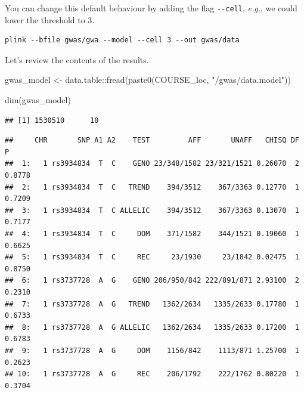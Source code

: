 \documentclass[
]{book}
\newenvironment{Shaded}{\begin{snugshade}}{\end{snugshade}}
\newcommand{\DecValTok}[1]{\textcolor[rgb]{0.00,0.00,0.81}{#1}}
\newcommand{\FunctionTok}[1]{\textcolor[rgb]{0.00,0.00,0.00}{#1}}
\newcommand{\NormalTok}[1]{#1}
\newcommand{\OtherTok}[1]{\textcolor[rgb]{0.56,0.35,0.01}{#1}}
\newcommand{\SpecialCharTok}[1]{\textcolor[rgb]{0.00,0.00,0.00}{#1}}
\newcommand{\StringTok}[1]{\textcolor[rgb]{0.31,0.60,0.02}{#1}}
\begin{document}
You can change this default behaviour by adding the flag \texttt{-\/-cell}, \emph{e.g.}, we could lower the threshold to 3.

\begin{verbatim}
plink --bfile gwas/gwa --model --cell 3 --out gwas/data
\end{verbatim}

Let's review the contents of the results.

\begin{Shaded}
\begin{Highlighting}[]
\NormalTok{gwas\_model }\OtherTok{\textless{}{-}}\NormalTok{ data.table}\SpecialCharTok{::}\FunctionTok{fread}\NormalTok{(}\FunctionTok{paste0}\NormalTok{(COURSE\_loc, }\StringTok{"/gwas/data.model"}\NormalTok{))}

\FunctionTok{dim}\NormalTok{(gwas\_model)}
\end{Highlighting}
\end{Shaded}

\begin{verbatim}
## [1] 1530510      10
\end{verbatim}

\begin{Shaded}
\end{Shaded}

\begin{verbatim}
##     CHR       SNP A1 A2    TEST         AFF       UNAFF   CHISQ DF      P
##  1:   1 rs3934834  T  C    GENO 23/348/1582 23/321/1521 0.26070  2 0.8778
##  2:   1 rs3934834  T  C   TREND    394/3512    367/3363 0.12770  1 0.7209
##  3:   1 rs3934834  T  C ALLELIC    394/3512    367/3363 0.13070  1 0.7177
##  4:   1 rs3934834  T  C     DOM    371/1582    344/1521 0.19060  1 0.6625
##  5:   1 rs3934834  T  C     REC     23/1930     23/1842 0.02475  1 0.8750
##  6:   1 rs3737728  A  G    GENO 206/950/842 222/891/871 2.93100  2 0.2310
##  7:   1 rs3737728  A  G   TREND   1362/2634   1335/2633 0.17780  1 0.6733
##  8:   1 rs3737728  A  G ALLELIC   1362/2634   1335/2633 0.17200  1 0.6783
##  9:   1 rs3737728  A  G     DOM    1156/842    1113/871 1.25700  1 0.2623
## 10:   1 rs3737728  A  G     REC    206/1792    222/1762 0.80220  1 0.3704
\end{verbatim}
\end{document}
